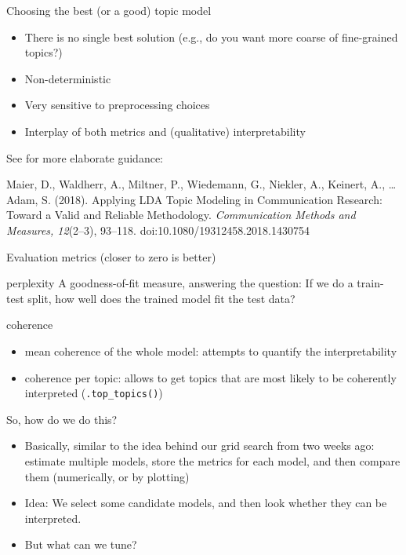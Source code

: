 \documentclass[compress]{beamer}
\begin{document}
\begin{frame}{Choosing the best (or a good) topic model}
\begin{itemize}
	\item There is no single best solution (e.g., do you want more coarse of fine-grained topics?)
	\item Non-deterministic
	\item Very sensitive to preprocessing choices
	\item Interplay of both metrics and (qualitative) interpretability 
\end{itemize}

See for more elaborate guidance:

\tiny{Maier, D., Waldherr, A., Miltner, P., Wiedemann, G., Niekler, A., Keinert, A., \ldots Adam, S. (2018). Applying LDA Topic Modeling in Communication Research: Toward a Valid and Reliable Methodology. \textit{Communication Methods and Measures, 12}(2--3), 93--118. doi:10.1080/19312458.2018.1430754}

\end{frame}



\begin{frame}{Evaluation metrics (closer to zero is better)}
\begin{block}{perplexity}
A goodness-of-fit measure, answering the question: If we do a train-test split, how well does the trained model fit the test data?
\end{block}

\pause 
\begin{block}{coherence}
\begin{itemize}
\item mean coherence of the whole model: attempts to quantify the interpretability
\item coherence per topic: allows to get topics that are most likely to be coherently interpreted (\texttt{.top\_topics()})
\end{itemize}
\end{block}

\end{frame}


\begin{frame}{So, how do we do this?}
\begin{itemize}[<+->]
	\item Basically, similar to the idea behind our grid search from two weeks ago: estimate multiple models, store the metrics for each model, and then compare them (numerically, or by plotting)
	\item Idea: We select some candidate models, and then look whether they can be interpreted.
	\item But what can we tune?
\end{itemize}
\end{frame}
\end{document}
